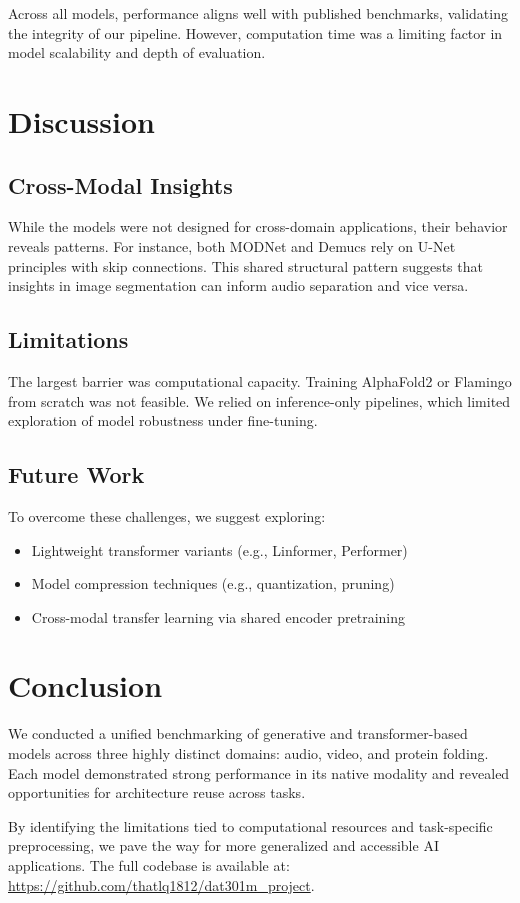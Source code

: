 \documentclass{article}
\begin{document}
Across all models, performance aligns well with published benchmarks, validating the integrity of our pipeline. However, computation time was a limiting factor in model scalability and depth of evaluation.

\section{Discussion}

\subsection{Cross-Modal Insights}
While the models were not designed for cross-domain applications, their behavior reveals patterns. For instance, both MODNet and Demucs rely on U-Net principles with skip connections. This shared structural pattern suggests that insights in image segmentation can inform audio separation and vice versa.

\subsection{Limitations}
The largest barrier was computational capacity. Training AlphaFold2 or Flamingo from scratch was not feasible. We relied on inference-only pipelines, which limited exploration of model robustness under fine-tuning.

\subsection{Future Work}
To overcome these challenges, we suggest exploring:
\begin{itemize}
  \item Lightweight transformer variants (e.g., Linformer, Performer)
  \item Model compression techniques (e.g., quantization, pruning)
  \item Cross-modal transfer learning via shared encoder pretraining
\end{itemize}

\section{Conclusion}

We conducted a unified benchmarking of generative and transformer-based models across three highly distinct domains: audio, video, and protein folding. Each model demonstrated strong performance in its native modality and revealed opportunities for architecture reuse across tasks. 

By identifying the limitations tied to computational resources and task-specific preprocessing, we pave the way for more generalized and accessible AI applications. The full codebase is available at: \url{https://github.com/thatlq1812/dat301m_project}.



\end{document}
